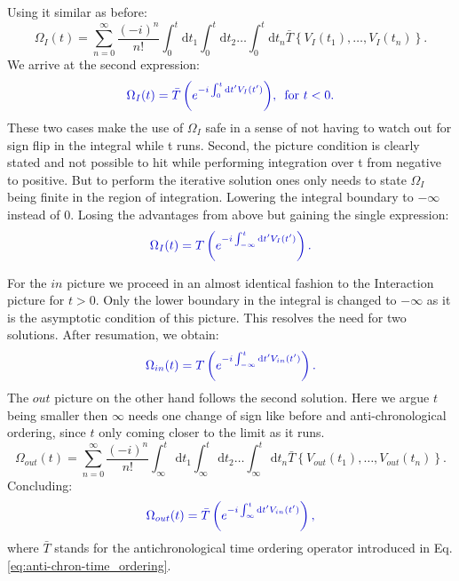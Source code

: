 \documentclass[12pt, titlepage]{article}
\begin{document}
Using it similar as before:
\begin{equation}
\Omega_{I}(t) =
\sum\limits_{n=0}^{\infty} 
\frac{(-i)^{n}}{n!}
\int_{0}^{t}\mathrm{d}t_1\int_{0}^{t}\! \! \mathrm{d}t_2
 \ldots
 \int_{0}^{t}\! \! \mathrm{d}t_n
 \bar{T}\left\lbrace V_{I}(t_1), \ldots , V_{I}(t_n)\right\rbrace .
\end{equation}
We arrive at the second expression:
\begin{equation}\label{eq:Omega_I_Chron_0<}
\textcolor[RGB]{0,0,204}{
\Omega_{I}(t)
= \bar{T}\left( e^{-i\int_{0}^{t}\mathrm{d}t^{\prime} V_{I}(t^{\prime})} \right)
	\! ,\text{\enskip for  }  t<0 
	.}
\end{equation}
These two cases make the use of $ \Omega_I $ safe in a sense of not having to watch out for sign flip in the integral while t runs. Second, the picture condition is clearly stated and not possible to hit while performing integration over t from negative to positive. But to perform the iterative solution ones only needs to state $ \Omega_{I} $ being finite in the region of integration. Lowering the integral boundary  to $ -\infty $ instead of $ 0 $. Losing the advantages from above but gaining the single expression:
\begin{equation}\label{eq:Omega_I_Chron_infty}
\textcolor[RGB]{0,0,204}{
\Omega_{I}(t)
=T\left( e^{-i\int_{-\infty}^{t}\mathrm{d}t^{\prime} V_{I}(t^{\prime})} \right)
	.}
\end{equation}

For the $ in $ picture we proceed in an almost identical fashion to the Interaction picture for $ t > 0 $. Only the lower boundary in the integral is changed to $ -\infty $ as it is the asymptotic condition of this picture. This resolves the need for two solutions. 
After resumation, we obtain:
\begin{equation}\label{eq:Omega_in_converg}
\textcolor[RGB]{0,0,204}{
\Omega_{in}(t)
= T\left( e^{-i\int_{-\infty}^{t}\mathrm{d}t^{\prime} V_{in}(t^{\prime})} \right)
	.}
\end{equation}
The $ out $ picture on the other hand follows the second solution. Here we argue $ t $ being smaller then $ \infty $ needs one change of sign like before and anti-chronological ordering, since $ t $ only coming closer to the limit as it runs.
\begin{equation}
\Omega_{out}(t) =
\sum\limits_{n=0}^{\infty} 
\frac{(-i)^{n}}{n!}
\int_{\infty}^{t}\mathrm{d}t_1\int_{\infty}^{t}\! \! \mathrm{d}t_2
 \ldots
 \int_{\infty}^{t}\! \! \mathrm{d}t_n
 \bar{T}\left\lbrace V_{out}(t_1), \ldots , V_{out}(t_n)\right\rbrace .
\end{equation}
Concluding:
\begin{equation}\label{eq:Omega_out_converg}
\textcolor[RGB]{0,0,204}{
\Omega_{out}(t)
= \bar{T}\left( e^{-i\int_{\infty}^{t}\mathrm{d}t^{\prime} V_{in}(t^{\prime})} \right)
	,}
\end{equation}
where $ \bar{T} $ stands for the antichronological time ordering operator introduced in Eq.\enskip\eqref{eq:anti-chron-time_ordering}.
\end{document}
